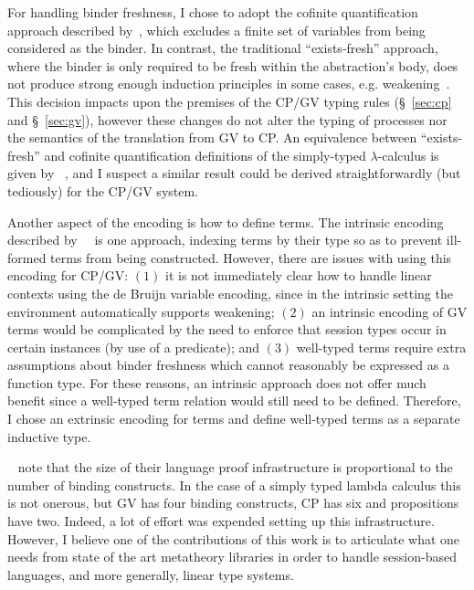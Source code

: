 For handling binder freshness, I chose to adopt the cofinite quantification
approach described by~\citeauthor{Aydemir:2008:EFM}, which excludes a finite
set of variables from being considered as the binder. In contrast, the
traditional ``exists-fresh'' approach, where the binder is only required to be
fresh within the abstraction's body, does not produce strong enough induction
principles in some cases, e.g. weakening~\cite{Aydemir:2008:EFM}. This
decision impacts upon the premises of the CP/GV typing rules (\S~\ref{sec:cp}
and \S~\ref{sec:gv}), however these changes do not alter the typing of
processes nor the semantics of the translation from GV to CP. An equivalence
between ``exists-fresh'' and cofinite quantification definitions of the
simply-typed $\lambda$-calculus is given by
\citeauthor{Aydemir:2008:EFM}~\cite{Aydemir:2008:EFM}, and I suspect a similar
result could be derived straightforwardly (but tediously) for the CP/GV
system.

Another aspect of the encoding is how to define terms. The intrinsic encoding
described by~\citeauthor{Benton:2012:STT}~\cite{Benton:2012:STT} is one
approach, indexing terms by their type so as to prevent ill-formed terms from
being constructed. However, there are issues with using this encoding for
CP/GV: $(1)$ it is not immediately clear how to handle linear contexts using
the de Bruijn variable encoding, since in the intrinsic setting the
environment automatically supports weakening; $(2)$ an intrinsic encoding of
GV terms would be complicated by the need to enforce that session types occur
in certain instances (by use of a predicate); and $(3)$ well-typed terms
require extra assumptions about binder freshness which cannot reasonably be
expressed as a function type. For these reasons, an intrinsic approach does
not offer much benefit since a well-typed term relation would still need to be
defined. Therefore, I chose an extrinsic encoding for terms and define
well-typed terms as a separate inductive type.

\citeauthor{Aydemir:2008:EFM}~\cite{Aydemir:2008:EFM} note that the size of
their language proof infrastructure is proportional to the number of binding
constructs. In the case of a simply typed lambda calculus this is not onerous,
but GV has four binding constructs, CP has six and propositions have
two. Indeed, a lot of effort was expended setting up this
infrastructure. However, I believe one of the contributions of this work is to
articulate what one needs from state of the art metatheory libraries in order
to handle session-based languages, and more generally, linear type systems.

